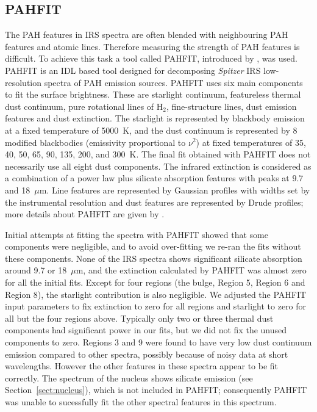 \subsection{PAHFIT}
\label{sect:pahfit}
The PAH features in  IRS spectra are often blended with neighbouring PAH features and atomic lines. 
Therefore measuring the strength of PAH features is difficult.  To achieve this task a tool called PAHFIT, introduced by \citet{Smith:2007lr}, was used. 
PAHFIT is an IDL  based tool designed for decomposing {\em Spitzer} IRS low-resolution spectra of PAH emission sources.
PAHFIT uses six main components to fit the surface brightness. These are starlight continuum, featureless thermal dust continuum, 
pure rotational lines of H$_2$, fine-structure lines, dust emission features and dust extinction. The starlight is represented by  blackbody 
emission at a fixed temperature of 5000~K, and the dust continuum is represented by 8 modified blackbodies (emissivity proportional to $\nu^2$)  
at fixed temperatures of 35, 40, 50, 65, 90, 135, 200, and 300~K. The final fit obtained with PAHFIT does not necessarily use
all eight dust components.
The infrared extinction is considered as a combination of a power law plus silicate absorption features with peaks at 9.7 and 18~$\mu$m. 
Line features are represented by Gaussian profiles with widths set by the instrumental resolution
and dust features are represented by Drude profiles; more details about PAHFIT are given by \citet{Smith:2007lr}.


Initial attempts at fitting the spectra with PAHFIT showed that some components were negligible, and
to avoid over-fitting we re-ran the fits without these components.
None of the IRS spectra shows significant silicate absorption around 9.7 or 18~$\mu$m, and the extinction calculated by PAHFIT 
was almost zero for all the initial fits. Except for four regions (the bulge, Region 5, Region 6 and Region 8),
the starlight contribution is also negligible.
We adjusted the PAHFIT input parameters to fix extinction to zero for all regions and starlight to zero for all but the four regions above.
Typically only two or three thermal dust components had significant power in our fits, but we did not fix the unused components to zero.
Regions 3 and 9 were found to have very low dust continuum emission compared to other spectra,
possibly because of noisy data at short wavelengths. However the other features in these spectra appear to
be fit correctly.
The spectrum of the nucleus shows silicate emission (see Section~\ref{sect:nucleus}), which is not included in PAHFIT;  
consequently PAHFIT was unable to sucessfully fit the other spectral features in this spectrum.

